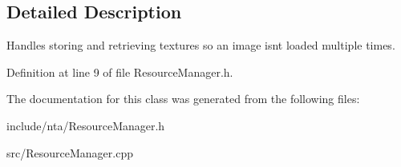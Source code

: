 \subsection{Detailed Description}
Handles storing and retrieving textures so an image isn\textquotesingle{}t loaded multiple times. 

Definition at line 9 of file Resource\+Manager.\+h.



The documentation for this class was generated from the following files\+:\begin{DoxyCompactItemize}
\item 
include/nta/Resource\+Manager.\+h\item 
src/Resource\+Manager.\+cpp\end{DoxyCompactItemize}
